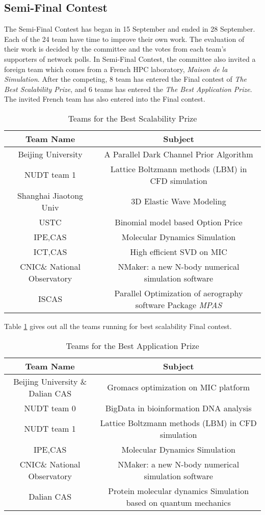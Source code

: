 
\subsection{Semi-Final Contest} %
\label{sub:Semi-Final}
The Semi-Final Contest has began in 15 September and ended in 28 September. Each of the 24 team have time to improve their own work. The evaluation of
their work is decided by the committee and the votes from each team's supporters of network polls. In Semi-Final Contest, the committee also invited 
a foreign team which comes from a French HPC laboratory, \textsl{Maison de la Simulation}. After the competing, 8 team has entered the Final contest of
\textsl{The Best Scalability Prize}, and 6 teams has entered the \textsl{The Best Application Prize}. The invited French team has also entered into 
the Final contest. 
\begin{table}[htbp]
\centering
\caption{Teams for the Best Scalability Prize}
\label{tab:bestScal}
\begin{tabular}{|c|c|}
\hline
Team Name & Subject\\
\hline
Beijing University & A Parallel Dark Channel Prior Algorithm \\
\hline
NUDT team 1 & Lattice Boltzmann methods (LBM) in CFD simulation \\
\hline
Shanghai Jiaotong Univ & 3D Elastic Wave Modeling \\
\hline
USTC & Binomial model based Option Price \\
\hline
IPE,CAS & Molecular Dynamics Simulation \\
\hline
ICT,CAS & High efficient SVD on MIC \\
\hline
CNIC\& National Observatory & NMaker: a new N-body numerical simulation software \\
\hline
ISCAS & Parallel Optimization of aerography software Package \textsl{MPAS} \\
\hline
\end{tabular}
\end{table}
Table \ref{tab:bestScal} gives out all the teams running for best scalability Final contest. 
\begin{table}[htbp]
\centering
\caption{Teams for the Best Application Prize}
\label{tab:bestApp}
\begin{tabular}{|c|c|}
\hline
Team Name & Subject \\
\hline
Beijing University \& Dalian CAS & Gromacs optimization on MIC platform \\
\hline
NUDT team 0 & BigData in bioinformation DNA analysis \\
\hline
NUDT team 1 & Lattice Boltzmann methods (LBM) in CFD simulation \\
\hline
IPE,CAS & Molecular Dynamics Simulation \\
\hline
CNIC\& National Observatory & NMaker: a new N-body numerical simulation software \\
\hline
Dalian CAS & Protein molecular dynamics Simulation based on quantum mechanics \\
\hline
\end{tabular}
\end{table}
